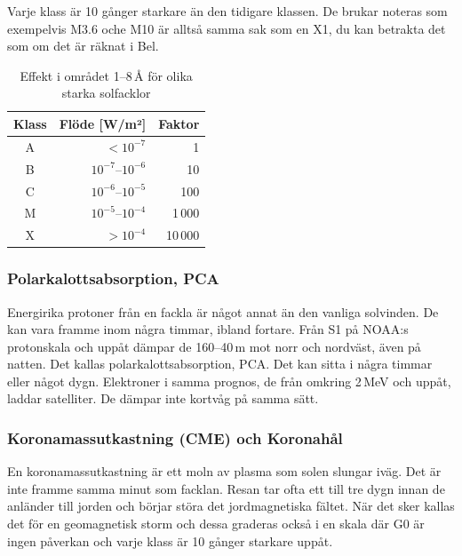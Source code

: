 Varje klass är 10 gånger starkare än den tidigare klassen. De brukar
noteras som exempelvis M3.6 oche M10 är alltså samma sak som en X1, du
kan betrakta det som om det är räknat i Bel.

\begin{table}[h]
  \begin{tabular}{crr}
    \bf Klass & \bf Flöde [W/m²]    & \bf Faktor \\ \hline
    A         & $<10^{-7}$          & 1          \\
    B         & $10^{-7}$--$10^{-6}$ & 10         \\
    C         & $10^{-6}$--$10^{-5}$ & 100        \\
    M         & $10^{-5}$--$10^{-4}$ & 1\,000     \\
    X         & $>10^{-4}$          & 10\,000    \\
  \end{tabular}
  \caption{Effekt i området 1--8\,Å för olika starka solfacklor}
\end{table}

\subsubsection{Polarkalottsabsorption, PCA}

Energirika protoner från en fackla är något annat än den vanliga
solvinden. De kan vara framme inom några timmar, ibland fortare. Från
S1 på NOAA:s protonskala och uppåt dämpar de 160--40\,m mot norr och
nordväst, även på natten. Det kallas polarkalottsabsorption, PCA. Det
kan sitta i några timmar eller något dygn. Elektroner i samma prognos,
de från omkring 2\,MeV och uppåt, laddar satelliter. De dämpar inte
kortvåg på samma sätt.

\subsubsection{Koronamassutkastning (CME) och Koronahål}

En koronamassutkastning är ett moln av plasma som solen slungar
iväg. Det är inte framme samma minut som facklan. Resan tar ofta ett
till tre dygn innan de anländer till jorden och börjar störa det
jordmagnetiska fältet. När det sker kallas det för en geomagnetisk
storm och dessa graderas också i en skala där G0 är ingen påverkan och
varje klass är 10 gånger starkare uppåt.

